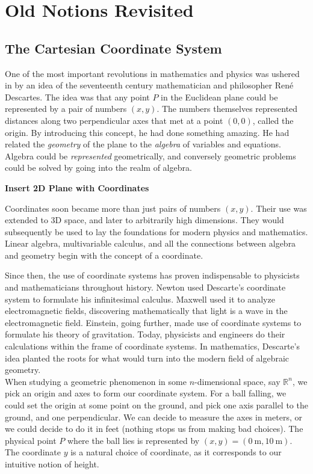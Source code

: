 \documentclass[../master.tex]{subfiles}
\begin{document}
	
	\chapter{Old Notions Revisited}
	\section{The Cartesian Coordinate System} %
	\label{sec:Cartesian}
	
	
	
	One of the most important revolutions in mathematics and physics was ushered in by an idea of the seventeenth century mathematician and philosopher Ren\'{e} Descartes. The idea was that any point $P$ in the Euclidean plane could be represented by a pair of numbers $(x,y)$. The numbers themselves represented distances along two perpendicular axes that met at a point $(0,0)$, called the origin. By introducing this concept, he had done something amazing. He had related the \emph{geometry} of the plane to the \emph{algebra} of variables and equations. Algebra could be \emph{represented} geometrically, and conversely geometric problems could be solved by going into the realm of algebra. 
	
	\textbf{Insert 2D Plane with Coordinates}
	
	Coordinates soon became more than just pairs of numbers $(x,y)$. Their use was extended to 3D space, and later to arbitrarily high dimensions. They would subsequently be used to lay the foundations for modern physics and mathematics. Linear algebra, multivariable calculus, and all the connections between algebra and geometry begin with the concept of a coordinate.
	
	Since then, the use of coordinate systems has proven indispensable to physicists and mathematicians throughout history. Newton used Descarte's coordinate system to formulate his infinitesimal calculus. Maxwell used it to analyze electromagnetic fields, discovering mathematically that light is a wave in the electromagnetic field. Einstein, going further, made use of coordinate systems to formulate his theory of gravitation. Today, physicists and engineers do their calculations within the frame of coordinate systems. In mathematics, Descarte's idea planted the roots for what would turn into the modern field of algebraic geometry. \\
	
	When studying a geometric phenomenon in some $n$-dimensional space, say $\mathbb{R}^n$, we pick an origin and axes to form our coordinate system. For a ball falling, we could set the origin at some point on the ground, and pick one axis parallel to the ground, and one perpendicular. We can decide to measure the axes in meters, or we could decide to do it in feet (nothing stops us from making bad choices). The physical point $P$ where the ball lies is represented by $(x,y)=(0~ \mathrm m,10~ \mathrm m)$. The coordinate $y$ is a natural choice of coordinate, as it corresponds to our intuitive notion of height. 
	
\end{document}
